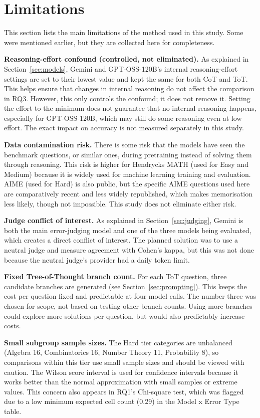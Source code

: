 \section{Limitations}
\label{sec:limitations}

This section lists the main limitations of the method used in this
study. Some were mentioned earlier, but they are collected here for
completeness.

\textbf{Reasoning-effort confound (controlled, not eliminated).} As
explained in Section~\ref{sec:models}, Gemini and GPT-OSS-120B's
internal reasoning-effort settings are set to their lowest value and kept
the same for both CoT and ToT. This helps ensure that changes in internal
reasoning do not affect the comparison in RQ3. However, this only
controls the confound; it does not remove it. Setting the effort to the
minimum does not guarantee that no internal reasoning happens, especially
for GPT-OSS-120B, which may still do some reasoning even at low effort.
The exact impact on accuracy is not measured separately in this study.

\textbf{Data contamination risk.} There is some risk that the models have
seen the benchmark questions, or similar ones, during pretraining instead
of solving them through reasoning. This risk is higher for Hendrycks MATH
(used for Easy and Medium) because it is widely used for machine learning
training and evaluation. AIME (used for Hard) is also public, but the
specific AIME questions used here are comparatively recent and less
widely republished, which makes memorisation less likely, though not
impossible. This study does not eliminate either risk.

\textbf{Judge conflict of interest.} As explained in
Section~\ref{sec:judging}, Gemini is both the main error-judging model
and one of the three models being evaluated, which creates a direct
conflict of interest. The planned solution was to use a neutral judge and
measure agreement with Cohen's kappa, but this was not done because the
neutral judge's provider had a daily token limit.

\textbf{Fixed Tree-of-Thought branch count.} For each ToT question, three
candidate branches are generated (see Section~\ref{sec:prompting}). This
keeps the cost per question fixed and predictable at four model calls.
The number three was chosen for scope, not based on testing other branch
counts. Using more branches could explore more solutions per question,
but would also predictably increase costs.

\textbf{Small subgroup sample sizes.} The Hard tier categories are
unbalanced (Algebra 16, Combinatorics 16, Number Theory 11, Probability
8), so comparisons within this tier use small sample sizes and should be
viewed with caution. The Wilson score interval is used for confidence
intervals because it works better than the normal approximation with
small samples or extreme values. This concern also appears in RQ1's
Chi-square test, which was flagged due to a low minimum expected cell
count (0.29) in the Model x Error Type table.

